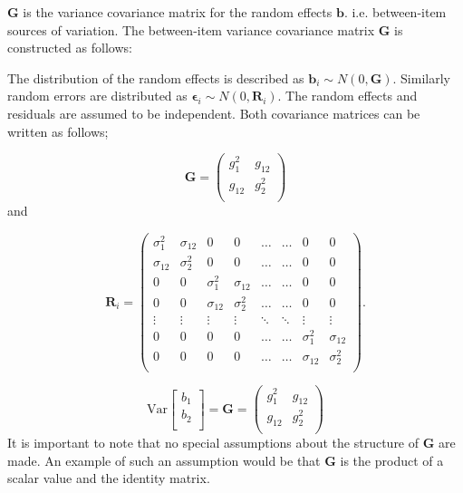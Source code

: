 \documentclass[12pt, a4paper]{article}
\theoremstyle{plain}
\theoremstyle{definition}
\theoremstyle{remark}
\begin{document}
	
	$\boldsymbol{G}$ is the variance covariance matrix for the random effects $\boldsymbol{b}$.
	i.e. between-item sources of variation. The between-item variance covariance matrix $\boldsymbol{G}$ is constructed as follows:
	
		The distribution of the random effects is described as $\boldsymbol{b}_i \sim N(0,\boldsymbol{G})$. Similarly  random errors are distributed as $\boldsymbol{\epsilon}_i \sim N(0,\boldsymbol{R}_i)$. The random effects and residuals are assumed to be independent. Both covariance matrices can be written as follows;
		
		
		\[ \boldsymbol{G} =\left(
		\begin{array}{cc}
		g^2_1  & g_{12} \\
		g_{12} & g^2_2 \\
		\end{array}
		\right) \]
		and
		
		
		\[ \boldsymbol{R}_i =\left(
		\begin{array}{cccccccc}
		\sigma^2_1  & \sigma_{12} & 0 & 0 & \ldots & \ldots & 0 & 0 \\
		\sigma_{12} & \sigma^2_2  & 0 & 0  & \ldots & \ldots & 0 & 0\\
		
		0 & 0 &\sigma^2_1  & \sigma_{12} & \ldots & \ldots& 0 &  0 \\
		0 & 0 &\sigma_{12} & \sigma^2_2  & \ldots & \ldots & 0 & 0 \\
		\vdots & \vdots &\vdots & \vdots & \ddots & \ddots& \vdots & \vdots \\
		
		0 & 0 &0 & 0 & \ldots & \ldots&\sigma^2_1  & \sigma_{12} \\
		0 & 0 &0 & 0 & \ldots & \ldots &\sigma_{12} & \sigma^2_2 \\
		\end{array}
		\right). \]
		
	\[ \mbox{Var}  \left[
	\begin{array}{c}
	b_1   \\
	b_2  \\
	\end{array}
	\right] =  \boldsymbol{G} =\left(
	\begin{array}{cc}
	g^2_1  & g_{12} \\
	g_{12} & g^2_2 \\
	\end{array}
	\right) \]
	It is important to note that no special assumptions about the structure of $\boldsymbol{G}$ are made. An example of such an assumption would be that $\boldsymbol{G}$ is the product of a scalar value and the identity matrix.
	
\end{document}
